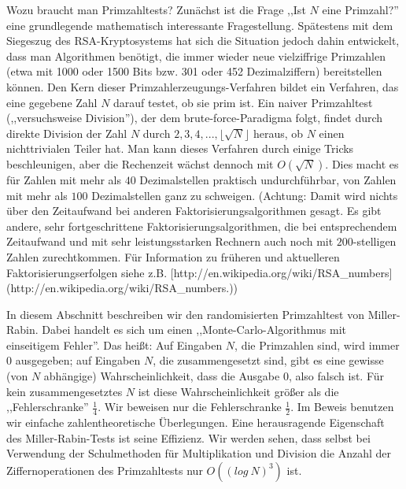 \documentclass[a4paper]{article}
\begin{document}
\begin{multicols}{3}
{        Wozu braucht man Primzahltests? Zunächst ist die Frage ,,Ist $N$ eine Primzahl?'' eine grundlegende mathematisch interessante Fragestellung. Spätestens mit dem Siegeszug des RSA-Kryptosystems hat sich die Situation jedoch dahin entwickelt, dass man Algorithmen benötigt, die immer wieder neue vielziffrige Primzahlen (etwa mit 1000 oder 1500 Bits bzw. 301 oder 452 Dezimalziffern) bereitstellen können. Den Kern dieser Primzahlerzeugungs-Verfahren bildet ein Verfahren, das eine gegebene Zahl $N$ darauf testet, ob sie prim ist. Ein naiver Primzahltest (,,versuchsweise Division''), der dem brute-force-Paradigma folgt, findet durch direkte Division der Zahl $N$ durch $2,3,4,...,\lfloor\sqrt{N}\rfloor$ heraus, ob $N$ einen nichttrivialen Teiler hat. Man kann dieses Verfahren durch einige Tricks beschleunigen, aber die Rechenzeit wächst dennoch mit $O(\sqrt{N})$. Dies macht es für Zahlen mit mehr als $40$ Dezimalstellen praktisch undurchführbar, von Zahlen mit mehr als $100$ Dezimalstellen ganz zu schweigen. (Achtung: Damit wird nichts über den Zeitaufwand bei anderen Faktorisierungsalgorithmen gesagt. Es gibt andere, sehr fortgeschrittene Faktorisierungsalgorithmen, die bei entsprechendem Zeitaufwand und mit sehr leistungsstarken Rechnern auch noch mit $200$-stelligen Zahlen zurechtkommen. Für Information zu früheren und aktuelleren Faktorisierungserfolgen siehe z.B. [http://en.wikipedia.org/wiki/RSA_numbers](http://en.wikipedia.org/wiki/RSA_numbers.))

        In diesem Abschnitt beschreiben wir den randomisierten Primzahltest von Miller-Rabin. Dabei handelt es sich um einen ,,Monte-Carlo-Algorithmus mit einseitigem Fehler''. Das heißt: Auf Eingaben $N$, die Primzahlen sind, wird immer $0$ ausgegeben; auf Eingaben $N$, die zusammengesetzt sind, gibt es eine gewisse (von $N$ abhängige) Wahrscheinlichkeit, dass die Ausgabe $0$, also falsch ist. Für kein zusammengesetztes $N$ ist diese Wahrscheinlichkeit größer als die ,,Fehlerschranke'' $\frac{1}{4}$. Wir beweisen nur die Fehlerschranke $\frac{1}{2}$. Im Beweis benutzen wir einfache zahlentheoretische Überlegungen. Eine herausragende Eigenschaft des Miller-Rabin-Tests ist seine Effizienz. Wir werden sehen, dass selbst bei Verwendung der Schulmethoden für Multiplikation und Division die Anzahl der Ziffernoperationen des Primzahltests nur $O((log\ N)^3)$ ist.

}
\end{multicols}
\end{document}
